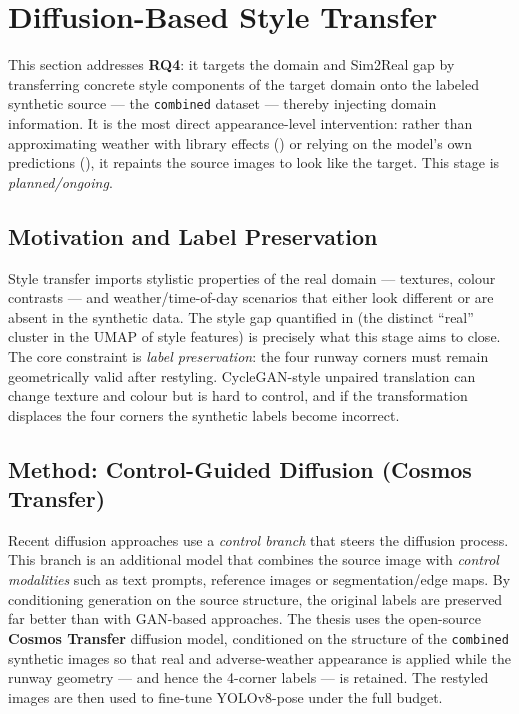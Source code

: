 \section{Diffusion-Based Style Transfer}
\label{sec:style-transfer}

This section addresses \textbf{RQ4}: it targets the domain and Sim2Real gap by
transferring concrete style components of the target domain onto the labeled synthetic
source --- the \texttt{combined} dataset --- thereby injecting domain information. It
is the most direct appearance-level intervention: rather than approximating weather
with library effects () or relying on the model's own
predictions (), it repaints the source images to look like the
target. This stage is \emph{planned/ongoing}.

\subsection{Motivation and Label Preservation}
\label{subsec:st-motivation}
Style transfer imports stylistic properties of the real domain --- textures, colour
contrasts --- and weather/time-of-day scenarios that either look different or are
absent in the synthetic data. The style gap quantified in 
(the distinct ``real'' cluster in the UMAP of style features) is precisely what this
stage aims to close. The core constraint is \emph{label preservation}: the four runway
corners must remain geometrically valid after restyling. CycleGAN-style unpaired
translation can change texture and colour but is hard to control, and if the
transformation displaces the four corners the synthetic labels become incorrect.

\subsection{Method: Control-Guided Diffusion (Cosmos Transfer)}
\label{subsec:st-method}
Recent diffusion approaches use a \emph{control branch} that steers the diffusion
process. This branch is an additional model that combines the source image with
\emph{control modalities} such as text prompts, reference images or
segmentation/edge maps. By conditioning generation on the source structure, the
original labels are preserved far better than with GAN-based approaches. The thesis
uses the open-source \textbf{Cosmos Transfer} diffusion model, conditioned on the
structure of the \texttt{combined} synthetic images so that real and adverse-weather
appearance is applied while the runway geometry --- and hence the 4-corner labels ---
is retained. The restyled images are then used to fine-tune YOLOv8-pose under the full
budget.

